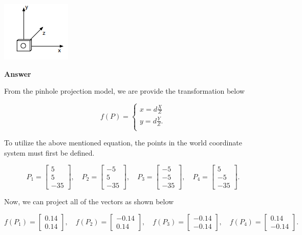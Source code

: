 \documentclass[12pt, letterpaper]{article}
\begin{document}
\begin{center}
\includegraphics[scale=1]{figs/cam_model.png}
\end{center}

{\bf{ Answer \\}}

From the pinhole projection model, we are provide the transformation below

 \[
      f(P)=\left\{
                \begin{array}{ll}
                  x = d \frac{X}{Z} \\
                  y = d \frac{Y}{Z} . \\
                \end{array}
              \right.
  \]
  
\indent To utilize the above mentioned equation, the points in the world coordinate system must first be defined.

$$
P_1 =  \begin{bmatrix} 5\\5\\-35 \end{bmatrix}, \quad P_2 =  \begin{bmatrix} -5\\5\\-35 \end{bmatrix}, \quad P_3 =  \begin{bmatrix} -5\\-5\\-35 \end{bmatrix}, \quad P_4 =  \begin{bmatrix} 5\\-5\\-35 \end{bmatrix}.
$$

Now, we can project all of the vectors as shown below 

$$
f(P_1) =  \begin{bmatrix} 0.14\\0.14 \end{bmatrix}, \quad f(P_2) =  \begin{bmatrix} -0.14\\0.14 \end{bmatrix}, \quad f(P_3) =  \begin{bmatrix} -0.14\\-0.14 \end{bmatrix}, \quad f(P_4) =  \begin{bmatrix} 0.14\\-0.14 \end{bmatrix}.
$$
\end{document}
